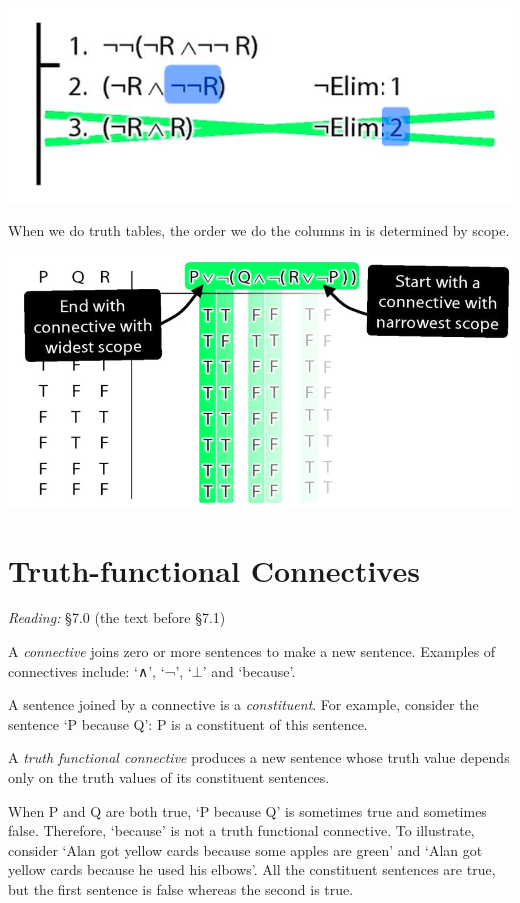 \documentclass[12pt]{extarticle}
\begin{document}
\begin{multicols*}{3}
\begin{center}
\includegraphics[scale=0.3]{img/unit_290_scope_proof.png}
\end{center}
When we do truth tables, the order we do the columns in is determined by scope.
 
\begin{center}
\includegraphics[scale=0.3]{img/unit_290_scope_tt.png}
\end{center}
 
 
\section{Truth-functional Connectives}
 
\emph{Reading:} §7.0 (the text before §7.1)
 
A \emph{connective} joins zero or more sentences to make a new sentence. Examples of connectives include: `∧', `¬', `$\bot$' and `because'.
 
A sentence joined by a connective is a \emph{constituent}. For example, consider the sentence ‘P because Q’: P is a constituent of this sentence.
 
A \emph{truth functional connective} produces a new sentence whose truth value depends only on the truth values of its constituent sentences.
 
When P and Q are both true, ‘P because Q’ is sometimes true and sometimes false. Therefore, ‘because’ is not a truth functional connective. To illustrate, consider `Alan got yellow cards because some apples are green' and `Alan got yellow cards because he used his elbows'. All the constituent sentences are true, but the first sentence is false whereas the second is true.
 

\end{multicols*}
\end{document}
